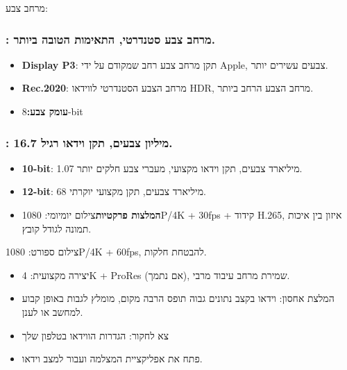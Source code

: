 מרחב צבע:


\subsubsection*{: מרחב צבע סטנדרטי, התאימות הטובה ביותר.}

\begin{itemize}
  \item \textbf{Display P3}: תקן מרחב צבע רחב שמקודם על ידי Apple, צבעים עשירים יותר.
  \item \textbf{Rec.2020}: מרחב הצבע הסטנדרטי לווידאו HDR, מרחב הצבע הרחב ביותר.
  \item \textbf{עומק צבע:}8-bit
\end{itemize}

\subsubsection*{: 16.7 מיליון צבעים, תקן וידאו רגיל.}

\begin{itemize}
  \item \textbf{10-bit}: 1.07 מיליארד צבעים, תקן וידאו מקצועי, מעברי צבע חלקים יותר.
  \item \textbf{12-bit}: 68 מיליארד צבעים, תקן מקצועי יוקרתי.
  \item \textbf{המלצות פרקטיות}צילום יומיומי: 1080P/4K + 30fps + קידוד H.265, איזון בין איכות תמונה לגודל קובץ.
\end{itemize}

\begin{tcbinfo}{צילום ספורט: 1080P/4K + 60fps, להבטחת חלקות.}
\begin{itemize}
  \item יצירה מקצועית: 4K + ProRes (אם נתמך), שמירת מרחב עיבוד מרבי.
  \item המלצת אחסון: וידאו בקצב נתונים גבוה תופס הרבה מקום, מומלץ לגבות באופן קבוע למחשב או לענן.
  \item צא לחקור: הגדרות הווידאו בטלפון שלך
  \item פתח את אפליקציית המצלמה ועבור למצב וידאו.
\end{itemize}

\end{tcbinfo}

